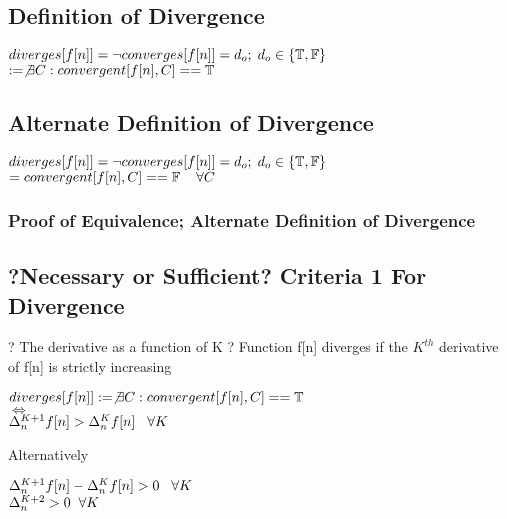 \documentclass[11pt]{article}
\begin{document}
\subsection{Definition of Divergence}
\begin{center}
\vspace{1mm}
$
diverges \lbrack f \lbrack n \rbrack \rbrack = \lnot converges[f[n]] = d_o; \hspace{1mm} d_o \in \{\mathbb{T},\mathbb{F}\}
$
\\ \vspace{4mm}
$
:= \not \exists C : convergent[f[n],C] == \mathbb{T}
$
\end{center}





\subsection{Alternate Definition of Divergence}
\begin{center}
\vspace{1mm}
$diverges \lbrack f \lbrack n \rbrack \rbrack = \lnot converges[f[n]] = d_o; \hspace{1mm} d_o \in \{\mathbb{T},\mathbb{F}\}$
\\ \vspace{4mm}
$
= convergent[f[n],C] == \mathbb{F} \hspace{4mm} \forall C
$
\end{center}
\subsubsection{Proof of Equivalence; Alternate Definition of Divergence}





\subsection{?Necessary or Sufficient? Criteria 1 For Divergence}
? The derivative as a function of K ?
Function f[n] diverges if the $K^{th}$ derivative of f[n] is strictly increasing
\vspace{1mm}
\begin{center}
$
diverges \lbrack f \lbrack n \rbrack \rbrack := \not \exists C : convergent[f[n],C] == \mathbb{T}
$
\\ \vspace{4mm}
$
\Longleftrightarrow
$
\\ \vspace{4mm}
$
\Delta_n^{K+1} f[n] > \Delta_n^{K}f[n] \hspace{3mm} \forall K
$
\end{center}
Alternatively
\begin{center}
$
\Delta_n^{K+1} f[n] - \Delta_n^{K}f[n] > 0 \hspace{3mm} \forall K
$
\\ \vspace{4mm}
$
\Delta_{n}^{K+2} > 0 \hspace{2mm} \forall K
$
\end{center}
\end{document}
